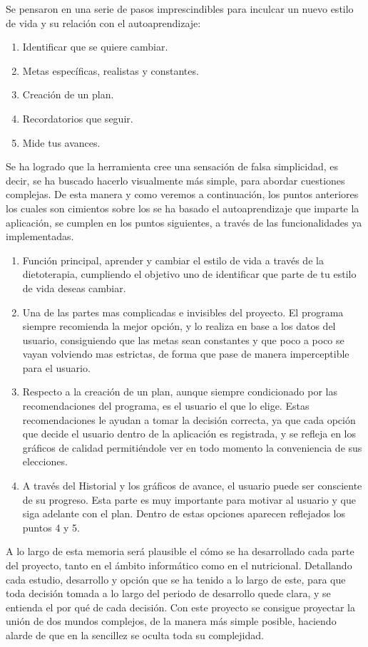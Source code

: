 Se pensaron en una serie de pasos imprescindibles para inculcar un nuevo estilo de vida y su relación con el autoaprendizaje:
\begin{enumerate}
\item	Identificar que se quiere cambiar.
\item	Metas específicas, realistas y constantes.
\item	Creación de un plan.
\item	Recordatorios que seguir.
\item	Mide tus avances.
\end{enumerate}
Se ha logrado que la herramienta cree una sensación de falsa simplicidad, es decir, se ha buscado hacerlo visualmente más simple, para abordar cuestiones complejas. De esta manera y como veremos a continuación, los puntos anteriores los cuales son cimientos sobre los se ha basado el autoaprendizaje que imparte la aplicación, se cumplen en los puntos siguientes, a través de las funcionalidades ya implementadas.

\begin{enumerate}
\item	Función principal, aprender y cambiar el estilo de vida a través de la dietoterapia, cumpliendo el objetivo uno de identificar que parte de tu estilo de vida deseas cambiar.
\item	Una de las partes mas complicadas e invisibles del proyecto. El programa siempre recomienda  la mejor opción, y lo realiza en base a los datos del usuario, consiguiendo que las metas sean constantes y que poco a poco se vayan volviendo mas estrictas, de forma que pase de manera imperceptible para el usuario.
\item	Respecto a la creación de un plan, aunque siempre condicionado por las recomendaciones del programa, es el usuario el que lo elige. Estas recomendaciones le ayudan a tomar la decisión correcta, ya que cada opción que decide el usuario dentro de la aplicación es registrada, y se refleja en los gráficos de calidad permitiéndole ver en todo momento la conveniencia de sus elecciones.
\item A través del Historial y los gráficos de avance, el usuario puede ser consciente de su progreso. Esta parte es muy importante para motivar al usuario y que siga adelante con el plan. Dentro de estas opciones aparecen reflejados los puntos 4 y 5.
\end{enumerate}

A lo largo de esta memoria será plausible el cómo se ha desarrollado cada parte del proyecto, tanto en el ámbito informático como en el nutricional. Detallando cada estudio, desarrollo y opción que se ha tenido a lo largo de este, para que toda decisión tomada a lo largo del periodo de desarrollo quede clara, y se entienda el por qué de cada decisión. Con este proyecto se consigue proyectar la unión de dos mundos complejos, de la manera más simple posible, haciendo alarde de que en la sencillez se oculta toda su complejidad.
